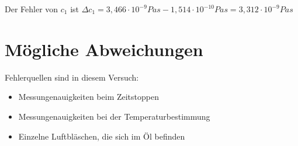    Der Fehler von $c_1$ ist $\Delta c_1 = 3,466 \cdot 10^{-9} Pas - 1,514 \cdot 10^{-10} Pas = 3,312 \cdot 10^{-9} Pas$ 
    \section{Mögliche Abweichungen}
    Fehlerquellen sind in diesem Versuch:
    \begin{itemize}
    \item Messungenauigkeiten beim Zeitstoppen
    \item Messungenauigkeiten bei der Temperaturbestimmung
    \item Einzelne Luftbläschen, die sich im Öl befinden
    \end{itemize}

\pagebreak